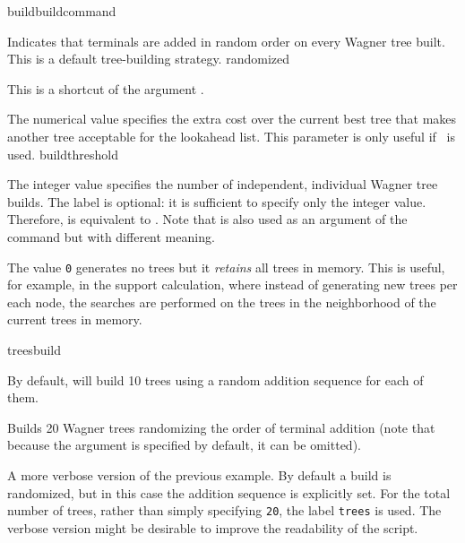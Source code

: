 \begin{command}{build}{buildcommand}
\begin{arguments}
            {Indicates that terminals are added in random order on every Wagner tree built. 
            This is a default tree-building strategy.}
            {randomized}

            {This is a shortcut of the argument .}
            {}

            {The numerical value specifies the extra cost over the current best
            tree that makes another tree acceptable for the lookahead list. This 
            parameter is only useful if~ is used.}
            {buildthreshold}
            
            {The integer value specifies the number of independent, individual
            Wagner tree builds. The label  is optional: it is
            sufficient to specify only the integer value. Therefore,  is
            equivalent to .  Note that   is
            also used as an argument of the command 
            but with different meaning.
            
            The value \texttt{0} generates no trees but it \emph{retains} all trees in memory.
            This is useful, for example, in the  support calculation,
            where instead of generating new trees per each node, the searches are
            performed on the trees in the neighborhood of the current trees in memory.}
            {treesbuild}
            

   \end{arguments}
      
       {By default, \poy will build 10 trees using a random addition sequence for
       each of them.}

	\begin{poyexamples}
            {Builds 20 Wagner trees randomizing the order of terminal
            addition (note that because the argument  
            is specified by default, it can be omitted).}

            {A more verbose version of the previous example. By default a build
            is randomized, but in this case the addition sequence is explicitly
            set. For the total number of trees, rather than simply specifying \texttt{20},
            the label \texttt{trees} is used. The verbose version might be desirable
            to improve the readability of the script.}


\end{poyexamples}
\end{command}
